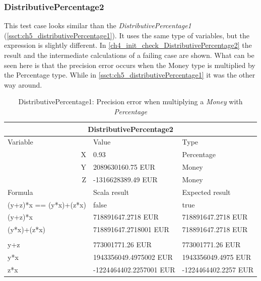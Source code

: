 \subsubsection{DistributivePercentage2}
This test case looks similar than the \textit{DistributivePercentage1} (\autoref{ssct:ch5_distributivePercentage1}). It uses the same type of variables, but the expression is slightly different. In \autoref{ch4_init_check_DistributivePercentage2} the result and the intermediate calculations of a failing case are shown. What can be seen here is that the precision error occurs when the Money type is multiplied by the Percentage type. While in \autoref{ssct:ch5_distributivePercentage1} it was the other way around.
\\
\begin{table}[h!]
\centering
\begin{tabular}{|lll|}
\hline
\multicolumn{3}{|c|}{DistributivePercentage2}                           \\ \hline
Variable               & Value                   & Type                 \\
\multicolumn{1}{|r}{X} & 0.93                    & Percentage           \\
\multicolumn{1}{|r}{Y} & 2089630160.75 EUR       & Money                \\
\multicolumn{1}{|r}{Z} & -1316628389.49 EUR      & Money                \\ \hline
Formula                & Scala result            & Expected result      \\
(y+z)*x == (y*x)+(z*x) & false                   & true                 \\
(y+z)*x                & 718891647.2718 EUR      & 718891647.2718 EUR   \\
(y*x)+(z*x)            & 718891647.2718001 EUR   & 718891647.2718 EUR   \\
                       &                         &                      \\
y+z                    & 773001771.26 EUR        & 773001771.26 EUR     \\
y*x                    & 1943356049.4975002 EUR  & 1943356049.4975 EUR  \\
z*x                    & -1224464402.2257001 EUR & -1224464402.2257 EUR \\ \hline
\end{tabular}
\caption{DistributivePercentage1: Precision error when multiplying a \textit{Money} with \textit{Percentage}}
\label{ch4_init_check_DistributivePercentage2}
\end{table}
\\

